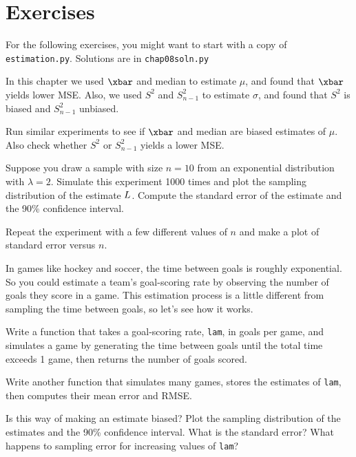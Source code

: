 \section{Exercises}

For the following exercises, you might want to start with a copy of
{\tt estimation.py}.  Solutions are in \verb"chap08soln.py"

\begin{exercise}

In this chapter we used $\xbar$ and median to estimate $\mu$, and
found that $\xbar$  yields lower MSE.
Also, we used $S^2$ and $S_{n-1}^2$ to estimate $\sigma$, and found that
$S^2$ is biased and $S_{n-1}^2$ unbiased.

Run similar experiments to see if $\xbar$ and median are biased estimates
of $\mu$.
Also check whether $S^2$ or $S_{n-1}^2$ yields a lower MSE.

\end{exercise}


\begin{exercise}

Suppose you draw a sample with size $n=10$ from 
an exponential distribution with $\lambda=2$.  Simulate
this experiment 1000 times and plot the sampling distribution of
the estimate $L$.  Compute the standard error of the estimate
and the 90\% confidence interval.

Repeat the experiment with a few different values of $n$ and make
a plot of standard error versus $n$.


\end{exercise}


\begin{exercise}

In games like hockey and soccer, the time between goals is
roughly exponential.  So you could estimate a team's goal-scoring rate
by observing the number of goals they score in a game.  This
estimation process is a little different from sampling the time
between goals, so let's see how it works.

Write a function that takes a goal-scoring rate, {\tt lam}, in goals
per game, and simulates a game by generating the time between goals
until the total time exceeds 1 game, then returns the number of goals
scored.

Write another function that simulates many games, stores the
estimates of {\tt lam}, then computes their mean error and RMSE.

Is this way of making an estimate biased?  Plot the sampling
distribution of the estimates and the 90\% confidence interval.  What
is the standard error?  What happens to sampling error for increasing
values of {\tt lam}?

\end{exercise}


